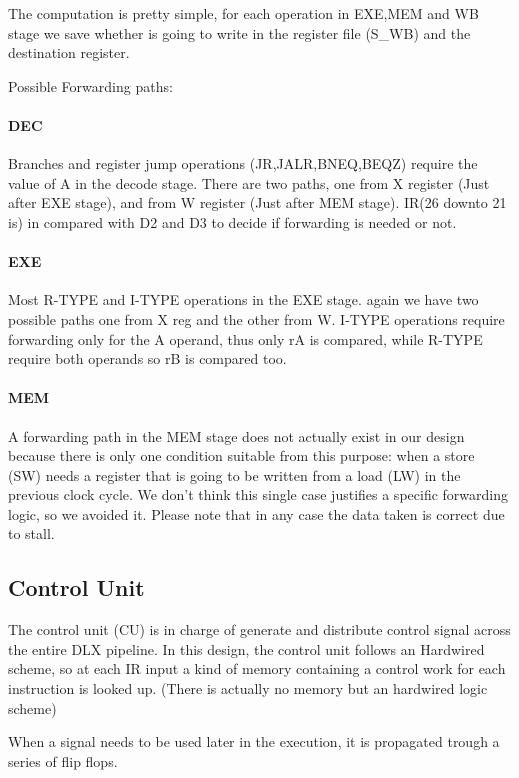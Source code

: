 \documentclass[12pt]{article}
\begin{document}
The computation is pretty simple, for each operation in EXE,MEM and WB stage we save whether is going to write in the register file (S\_WB) and the destination register.

Possible Forwarding paths:
\paragraph{DEC} Branches and register jump operations (JR,JALR,BNEQ,BEQZ) require the value of A in the decode stage. There are two paths, one from X register (Just after EXE stage), and from W register (Just after MEM stage). IR(26 downto 21 is) in compared with D2 and D3 to decide if forwarding is needed or not.
\paragraph{EXE} Most R-TYPE and I-TYPE operations in the EXE stage. again we have two possible paths one from X reg and the other from W. I-TYPE operations require forwarding only for the A operand, thus only rA is compared, while R-TYPE require both operands so rB is compared too.
\paragraph{MEM} A forwarding path in the MEM stage does not actually exist in our design because there is only one condition suitable from this purpose: when a store (SW) needs a register that is going to be written from a load (LW) in the previous clock cycle.
We don't think this single case justifies a specific forwarding logic, so we avoided it. Please note that in any case the data taken is correct due to stall.

\subsection{Control Unit}
The control unit (CU) is in charge of generate and distribute control signal across the entire DLX pipeline.
In this design, the control unit follows an Hardwired scheme, so at each IR input a kind of memory containing a control work for each instruction is looked up. (There is actually no memory but an hardwired logic scheme)

When a signal needs to be used later in the execution, it is propagated trough a series of flip flops.
\end{document}
